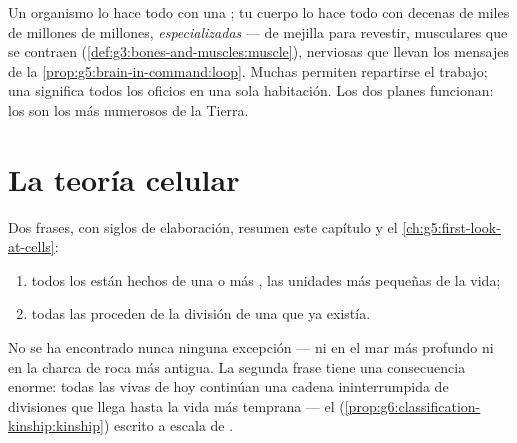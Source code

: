 \begin{remark}\label{rem:g6:cell-unit-of-life:twoways}
Un organismo  lo hace todo con una ; tu cuerpo lo hace
todo con decenas de miles de millones de millones,
\emph{especializadas} ---  de mejilla para revestir, 
musculares que se contraen
(\cref{def:g3:bones-and-muscles:muscle}),  nerviosas que llevan
los mensajes de la \cref{prop:g5:brain-in-command:loop}. Muchas 
permiten repartirse el trabajo; una  significa todos los oficios
en una sola habitación. Los dos planes funcionan: los  son
los  más numerosos de la Tierra.
\end{remark}

\section{La teoría celular}

\begin{proposition}\label{prop:g6:cell-unit-of-life:theory}
Dos frases, con siglos de elaboración, resumen este capítulo y el
\cref{ch:g5:first-look-at-cells}:
\begin{enumerate}
  \item todos los  están hechos de una o más , las
        unidades más pequeñas de la vida;
  \item todas las  proceden de la división de una  que ya
        existía.
\end{enumerate}
No se ha encontrado nunca ninguna excepción --- ni en el mar más
profundo ni en la charca de roca más antigua. La segunda frase tiene
una consecuencia enorme: todas las  vivas de hoy continúan una
cadena ininterrumpida de divisiones que llega hasta la vida más
temprana --- el 
(\cref{prop:g6:classification-kinship:kinship}) escrito a escala de
.
\end{proposition}
\admitted

